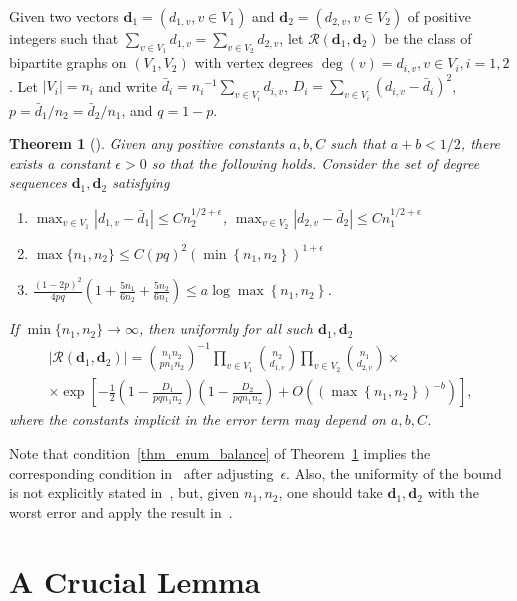 \documentclass[12pt,reqno]{amsart}
\newcommand{\rc}{{\mathcal{R}}}
\newcommand{\dd}{\mathbf{d}}
\newcommand{\rcdd}{\rc(\dd_1,\dd_2)}
\newtheorem{theorem}{Theorem}
\theoremstyle{definition}
\newenvironment{romenumerate}[1][-0.25em]
 {%
  \vspace{#1}\begin{enumerate}%
  \renewcommand{\labelenumi}{\textup{(\roman{enumi})}}%
  \renewcommand{\theenumi}{\textup{(\roman{enumi})}}%
 }
 {\end{enumerate}}
\begin{document}
Given two vectors $\dd_1 = (d_{1,v}, v \in V_1)$ and $\dd_2 = (d_{2,v}, v \in V_2)$ of positive integers such that $\sum_{v \in V_1} d_{1, v} = \sum_{v \in V_2} d_{2,v}$, let $\rcdd$ be the class of bipartite graphs on $(V_1, V_2)$ with vertex degrees $\deg(v) = d_{i,v}, v \in V_i, i = 1,2$.
Let $|V_i| = n_i$ and write $\bar d_i = {n_i}^{-1}\sum_{v \in V_i} d_{i,v}$, $D_i = \sum_{v \in V_i} (d_{i,v} - \bar d_i)^2$,
$p = \bar d_1/n_2 = \bar d_2/n_1$, and $q = 1 - p$.
\begin{theorem}[\cite{CGM}]\label{thm_enum}
	Given any positive constants $a, b, C$ such that $a+b < 1/2$, there exists a constant $\epsilon > 0$ so that the following holds. Consider the set of degree sequences $\dd_1,\dd_2$ satisfying
\begin{romenumerate}
	\item\label{thm_enum_max} $\max_{v \in V_1}|d_{1,v} - \bar d_1| \le Cn_2^{1/2 + \epsilon}$, $\max_{v \in V_2} |d_{2,v} - \bar d_2| \le Cn_1^{1/2 + \epsilon}$
	\item\label{thm_enum_balance} $\max \{n_1, n_2\} \le C(pq)^2(\min \left\{ n_1, n_2 \right\})^{1 + \epsilon}$
\item\label{thm_enum_dense}
	$  \frac{(1 - 2p)^2}{4pq} \left( 1 + \frac{5n_1}{6n_2} + \frac{5n_2}{6n_1} \right) \le a \log \max \left\{ n_1, n_2 \right\}$.
\end{romenumerate}
If $\min\{n_1, n_2\} \to \infty$, then uniformly for all such $\dd_1,\dd_2$
\begin{multline}
  \label{eq_enum}
	|\rc(\dd_1,\dd_2)| = \binom{n_1n_2}{p n_1n_2}^{-1} \prod_{v \in V_1}\binom {n_2}{d_{1,v}} \prod_{v \in V_2}\binom {n_1}{d_{2,v}} \times \\
	\times \exp \left[ -\frac{1}{2}\left( 1- \frac{D_1}{pqn_1n_2} \right)\left(1- \frac{D_2}{pqn_1n_2} \right) + O\left((\max\left\{ n_1,n_2 \right\})^{-b}\right) \right],
\end{multline}
where the constants implicit in the error term may depend on $a,b,C$.
\end{theorem}
Note that condition~\ref{thm_enum_balance} of Theorem~\ref{thm_enum} implies the corresponding condition in~\cite{CGM} after adjusting~$\epsilon$.
Also, the uniformity of the bound is not explicitly stated in~\cite{CGM}, but, given $n_1, n_2$, one should take $\dd_1, \dd_2$ with the worst error and apply the result in~\cite{CGM}.





\section{A Crucial Lemma}
\label{sec_crucial}
\end{document}
